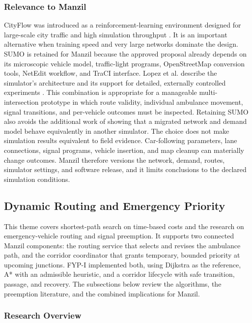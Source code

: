 \subsubsection{Relevance to Manzil}

CityFlow was introduced as a reinforcement-learning environment designed for large-scale city traffic and high simulation throughput \cite{zhang2019cityflow}. It is an important alternative when training speed and very large networks dominate the design. SUMO is retained for Manzil because the approved proposal already depends on its microscopic vehicle model, traffic-light programs, OpenStreetMap conversion tools, NetEdit workflow, and TraCI interface. Lopez et al. describe the simulator's architecture and its support for detailed, externally controlled experiments \cite{lopez2018sumo}. This combination is appropriate for a manageable multi-intersection prototype in which route validity, individual ambulance movement, signal transitions, and per-vehicle outcomes must be inspected. Retaining SUMO also avoids the additional work of showing that a migrated network and demand model behave equivalently in another simulator. The choice does not make simulation results equivalent to field evidence. Car-following parameters, lane connections, signal programs, vehicle insertion, and map cleanup can materially change outcomes. Manzil therefore versions the network, demand, routes, simulator settings, and software release, and it limits conclusions to the declared simulation conditions.

\subsection{Dynamic Routing and Emergency Priority}

This theme covers shortest-path search on time-based costs and the research on emergency-vehicle routing and signal preemption. It supports two connected Manzil components: the routing service that selects and revises the ambulance path, and the corridor coordinator that grants temporary, bounded priority at upcoming junctions. FYP-I implemented both, using Dijkstra as the reference, A* with an admissible heuristic, and a corridor lifecycle with safe transition, passage, and recovery. The subsections below review the algorithms, the preemption literature, and the combined implications for Manzil.

\subsubsection{Research Overview}

